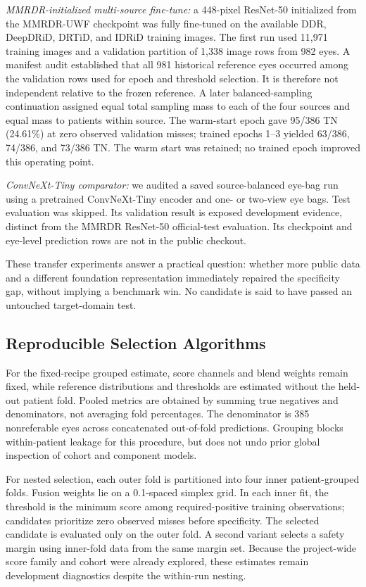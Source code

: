 \documentclass{ieeeaccess}
\begin{document}
\textit{MMRDR-initialized multi-source fine-tune:} a 448-pixel ResNet-50 initialized from the MMRDR-UWF checkpoint was fully fine-tuned on the available DDR, DeepDRiD, DRTiD, and IDRiD training images. The first run used 11,971 training images and a validation partition of 1,338 image rows from 982 eyes. A manifest audit established that all 981 historical reference eyes occurred among the validation rows used for epoch and threshold selection. It is therefore not independent relative to the frozen reference. A later balanced-sampling continuation assigned equal total sampling mass to each of the four sources and equal mass to patients within source. The warm-start epoch gave 95/386 TN (24.61\%) at zero observed validation misses; trained epochs 1--3 yielded 63/386, 74/386, and 73/386 TN. The warm start was retained; no trained epoch improved this operating point.

\textit{ConvNeXt-Tiny comparator:} we audited a saved source-balanced eye-bag run using a pretrained ConvNeXt-Tiny encoder and one- or two-view eye bags. Test evaluation was skipped. Its validation result is exposed development evidence, distinct from the MMRDR ResNet-50 official-test evaluation. Its checkpoint and eye-level prediction rows are not in the public checkout.

These transfer experiments answer a practical question: whether more public data and a different foundation representation immediately repaired the specificity gap, without implying a benchmark win. No candidate is said to have passed an untouched target-domain test.

\subsection{Reproducible Selection Algorithms}
For the fixed-recipe grouped estimate, score channels and blend weights remain fixed, while reference distributions and thresholds are estimated without the held-out patient fold. Pooled metrics are obtained by summing true negatives and denominators, not averaging fold percentages. The denominator is 385 nonreferable eyes across concatenated out-of-fold predictions. Grouping blocks within-patient leakage for this procedure, but does not undo prior global inspection of cohort and component models.

For nested selection, each outer fold is partitioned into four inner patient-grouped folds. Fusion weights lie on a 0.1-spaced simplex grid. In each inner fit, the threshold is the minimum score among required-positive training observations; candidates prioritize zero observed misses before specificity. The selected candidate is evaluated only on the outer fold. A second variant selects a safety margin using inner-fold data from the same margin set. Because the project-wide score family and cohort were already explored, these estimates remain development diagnostics despite the within-run nesting.
\end{document}
